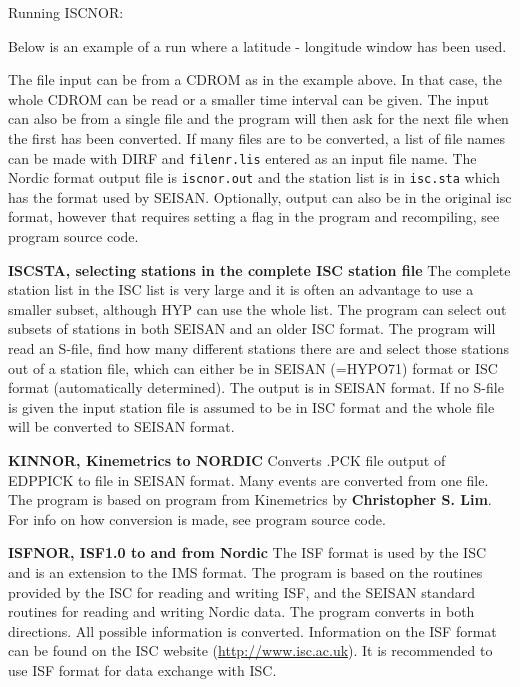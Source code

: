 Running ISCNOR: 

Below is an example of a run where a latitude - longitude window has been used.  



The file input can be from a CDROM as in the example above. In that case, the whole CDROM can be read or a smaller time interval can be given. The input can also be from a single file and the program will then ask for the next file when the first has been converted. If many files are to be converted, a list of file names can be made with DIRF and \texttt{filenr.lis} entered as an input file name. The Nordic format output file is \texttt{iscnor.out} and the station list is in \texttt{isc.sta} which has the format used by SEISAN. Optionally, output can also be in the original isc format, however that requires setting a flag in the program and recompiling, see program source code. 

\textbf{ISCSTA, selecting stations in the complete ISC station file} \newline
{}
The complete station list in the ISC list is very large and it is often an advantage to use a smaller subset, although HYP can use the whole list. The program can select out subsets of stations in both SEISAN and an older ISC format. The program will read an S-file, find how many different stations there are and select those stations out of a station file, which can either be in SEISAN (=HYPO71) format or ISC format (automatically determined). The output is in SEISAN format. If no S-file is given the input station file is assumed to be in ISC format and the whole file will be converted to SEISAN format. 

\textbf{KINNOR, Kinemetrics to NORDIC} \newline
Converts .PCK file output of EDPPICK to file in SEISAN format. Many events are converted from one file. The program is based on program from Kinemetrics by \textbf{Christopher S. Lim}. For info on how conversion is made, see program source code.  

\textbf{ISFNOR, ISF1.0 to and from Nordic}\newline
{}
The ISF format is used by the ISC and is an extension to the IMS format. The program is based on the routines provided by the ISC for reading and writing ISF, and the SEISAN standard routines for reading and writing Nordic data. The program converts in both directions. All possible information is converted. Information on the ISF format can be found on the ISC website (\url{http://www.isc.ac.uk}). It is recommended to use ISF format for data exchange with ISC. 

